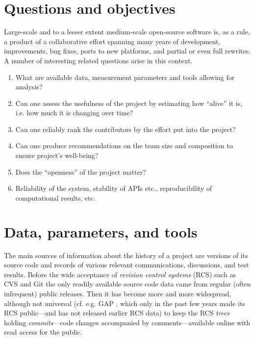 \documentclass{deliverablereport}
\author{Dmitrii Pasechnik}
\begin{document}
\maketitle
%
\strut\githubissuedescription
\newpage\tableofcontents

\section{Questions and objectives}

Large-scale and to a lesser extent medium-scale open-source software 
is, as a rule, a product of a collaborative effort spanning many years of
development, improvements, bug fixes, ports to new platforms,
and partial or even full rewrites. A number of interesting related questions
arise in this context.
\begin{enumerate}
\item What are available data, measurement parameters and tools
allowing for analysis?
\item Can one assess the usefulness of the project by estimating
how ``alive'' it is, i.e. how much it is changing over time?
\item Can one reliably rank the contributors
by the effort put into the project?
\item Can one produce recommendations on the team size and composition
to ensure project's well-being?
\item Does the ``openness'' of the project matter?
\item Reliability of the system, stability of APIs etc., 
reproducibility of computational results, etc.
\end{enumerate}

\section{Data, parameters, and tools}

The main sources of information about the history of a project are versions of
its source code and records of various relevant communications, discussions, and
test results.  Before the wide acceptance of {\em revision control systems} 
(RCS) \cite{OSullivan:MakingSenseOfRCS} such as  CVS \cite{CVSWeb} and
Git \cite{ChaStr:pg14} the only readily available source code data came from
regular (often infrequent) public releases. Then it has become
more and more widespread, although not universal (cf. e.g. GAP \cite{gap},
which only in the past few years made its RCS 
public---and has not released earlier RCS data)
to keep the RCS {\em trees} holding {\em commits}---code changes
accompanied by comments---available online with read access for the public.
\end{document}
